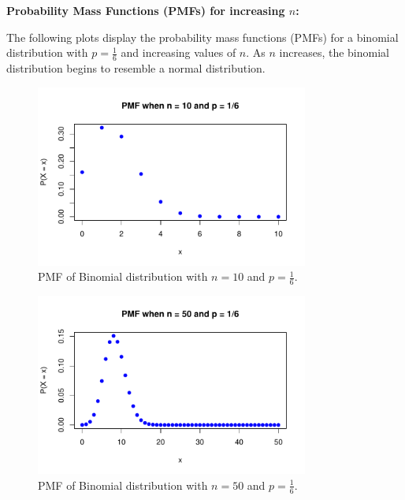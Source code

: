 \textbf{Probability Mass Functions (PMFs) for increasing \(n\):}

\vspace{0.5em}

The following plots display the probability mass functions (PMFs) for a binomial distribution with \( p = \frac{1}{6} \) and increasing values of \( n \). As \( n \) increases, the binomial distribution begins to resemble a normal distribution.


\begin{figure}[h!]
  \centering
 \includegraphics[width=0.8\textwidth]{Section4/images/pmf_plot.pdf}
 \vspace{-10pt} %
\captionsetup{skip=0pt} %
 \caption{PMF of Binomial distribution with \(n = 10\) and \(p = \frac{1}{6}\).}
\end{figure}

\begin{figure}[h!]
  \centering
  \includegraphics[width=0.8\textwidth]{Section4/images/pmf_n50.pdf}
  \vspace{-10pt} %
  \captionsetup{skip=0pt} %
  \caption{PMF of Binomial distribution with \(n = 50\) and \(p = \frac{1}{6}\).}
\end{figure}

